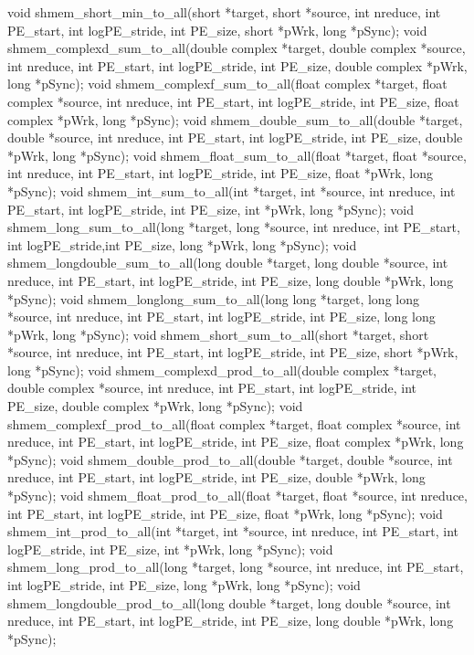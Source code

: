 void shmem_short_min_to_all(short *target, short *source, int nreduce, int PE_start, int logPE_stride, int PE_size, short *pWrk, long *pSync);
void shmem_complexd_sum_to_all(double complex *target, double complex *source, int nreduce, int PE_start, int logPE_stride, int PE_size, double complex *pWrk, long *pSync);
void shmem_complexf_sum_to_all(float complex *target, float complex *source, int nreduce, int PE_start, int logPE_stride, int PE_size, float complex *pWrk, long *pSync);
void shmem_double_sum_to_all(double *target, double *source, int nreduce, int PE_start, int logPE_stride, int PE_size, double *pWrk, long *pSync);
void shmem_float_sum_to_all(float *target, float *source, int nreduce, int PE_start, int logPE_stride, int PE_size, float *pWrk, long *pSync);
void shmem_int_sum_to_all(int *target, int *source, int nreduce, int PE_start, int logPE_stride, int PE_size, int *pWrk, long *pSync);
void shmem_long_sum_to_all(long *target, long *source, int nreduce, int PE_start, int logPE_stride,int PE_size, long *pWrk, long *pSync);
void shmem_longdouble_sum_to_all(long double *target, long double *source, int nreduce, int PE_start, int logPE_stride, int PE_size, long double *pWrk, long *pSync);
void shmem_longlong_sum_to_all(long long *target, long long *source, int nreduce, int PE_start, int logPE_stride, int PE_size, long long *pWrk, long *pSync);
void shmem_short_sum_to_all(short *target, short *source, int nreduce, int PE_start, int logPE_stride, int PE_size, short *pWrk, long *pSync);
void shmem_complexd_prod_to_all(double complex *target, double complex *source, int nreduce, int PE_start, int logPE_stride, int PE_size, double complex *pWrk, long *pSync);
void shmem_complexf_prod_to_all(float complex *target, float complex *source, int nreduce, int PE_start, int logPE_stride, int PE_size, float complex *pWrk, long *pSync);
void shmem_double_prod_to_all(double *target, double *source, int nreduce, int PE_start, int logPE_stride, int PE_size, double *pWrk, long *pSync);
void shmem_float_prod_to_all(float *target, float *source, int nreduce, int PE_start, int logPE_stride, int PE_size, float *pWrk, long *pSync);
void	shmem_int_prod_to_all(int *target, int *source, int nreduce, int PE_start, int logPE_stride, int PE_size, int *pWrk, long *pSync);
void shmem_long_prod_to_all(long *target, long *source, int nreduce, int PE_start, int logPE_stride, int PE_size, long *pWrk, long *pSync);
void shmem_longdouble_prod_to_all(long double *target, long double *source, int nreduce, int PE_start, int logPE_stride, int PE_size, long double *pWrk, long *pSync);
